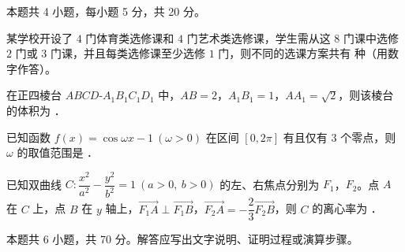 \begin{gktip}
本题共 4 小题，每小题 5 分，共 20 分。
\end{gktip}

\begin{question}
某学校开设了 $4$ 门体育类选修课和 $4$ 门艺术类选修课，学生需从这 $8$ 门课中选修 $2$ 门或 $3$ 门课，并且每类选修课至少选修 $1$ 门，则不同的选课方案共有 \gkblank{} 种（用数字作答）。

\end{question}
\begin{question}
在正四棱台 $ABCD\text{-}A_1B_1C_1D_1$ 中，$AB=2$，$A_1B_1=1$，$AA_1=\sqrt2$，则该棱台的体积为 \gkblank{}．

\end{question}
\begin{question}
已知函数 $f(x)=\cos\omega x-1\ (\omega>0)$ 在区间 $[0,2\pi]$ 有且仅有 $3$ 个零点，则 $\omega$ 的取值范围是 \gkblank{}．

\end{question}
\begin{question}
已知双曲线 $C:\dfrac{x^{2}}{a^{2}}-\dfrac{y^{2}}{b^{2}}=1\ (a>0,\ b>0)$ 的左、右焦点分别为 $F_1$，$F_2$。点 $A$ 在 $C$ 上，点 $B$ 在 $y$ 轴上，$\overrightarrow{F_1A}\perp\overrightarrow{F_1B}$，$\overrightarrow{F_2A}=-\dfrac23\overrightarrow{F_2B}$，则 $C$ 的离心率为 \gkblank{}．

\par\medskip

\end{question}

\begin{gktip}
本题共 6 小题，共 70 分。解答应写出文字说明、证明过程或演算步骤。
\end{gktip}

